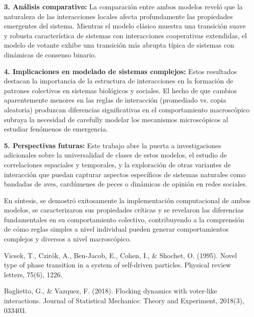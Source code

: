 \documentclass{article}
\begin{document}
\medskip

\textbf{3. Análisis comparativo:} La comparación entre ambos modelos reveló que la naturaleza de las interacciones locales afecta profundamente las propiedades emergentes del sistema. Mientras el modelo clásico muestra una transición suave y robusta característica de sistemas con interacciones cooperativas extendidas, el modelo de votante exhibe una transición más abrupta típica de sistemas con dinámicas de consenso binario.

\medskip

\textbf{4. Implicaciones en modelado de sistemas complejos:} Estos resultados destacan la importancia de la estructura de interacciones en la formación de patrones colectivos en sistemas biológicos y sociales. El hecho de que cambios aparentemente menores en las reglas de interacción (promediado vs. copia aleatoria) produzcan diferencias significativas en el comportamiento macroscópico subraya la necesidad de carefully modelar los mecanismos microscópicos al estudiar fenómenos de emergencia.

\medskip

\textbf{5. Perspectivas futuras:} Este trabajo abre la puerta a investigaciones adicionales sobre la universalidad de clases de estos modelos, el estudio de correlaciones espaciales y temporales, y la exploración de otras variantes de interacción que puedan capturar aspectos específicos de sistemas naturales como bandadas de aves, cardúmenes de peces o dinámicas de opinión en redes sociales.

\medskip

En síntesis, se demostró exitosamente la implementación computacional de ambos modelos, se caracterizaron sus propiedades críticas y se revelaron las diferencias fundamentales en su comportamiento colectivo, contribuyendo a la comprensión de cómo reglas simples a nivel individual pueden generar comportamientos complejos y diversos a nivel macroscópico.

\begin{thebibliography}{9}
Vicsek, T., Czirók, A., Ben-Jacob, E., Cohen, I., \& Shochet, O. (1995). Novel type of phase transition in a system of self-driven particles. Physical review letters, 75(6), 1226.

Baglietto, G., \& Vazquez, F. (2018). Flocking dynamics with voter-like interactions. Journal of Statistical Mechanics: Theory and Experiment, 2018(3), 033403.
\end{thebibliography}
\end{document}
